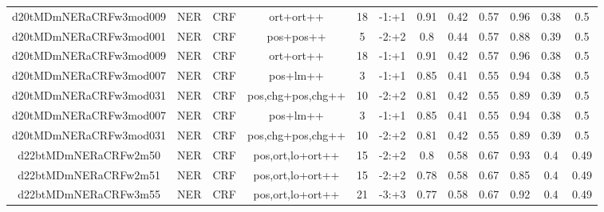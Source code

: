 \documentclass[a4paper]{article}
\begin{document}
\begin{landscape}
\begin{center}
\begin{tabular}{ |c|c|c|c|c|c|c|c|c|c|c|c|}
 
 	
 	\small{ d20tMDmNERaCRFw3mod009 } & \small{ NER} & \small{  CRF }  & ort+ort++  &  18 &  \small{  -1:+1 }  &  0.91 & 0.42 & 0.57  &  0.96 & 0.38 & 0.5 \\
 	

 
 	
 	\small{ d20tMDmNERaCRFw3mod001 } & \small{ NER} & \small{  CRF }  & pos+pos++  &  5 &  \small{  -2:+2 }  &  0.8 & 0.44 & 0.57  &  0.88 & 0.39 & 0.5 \\
 	

 
 	
 	\small{ d20tMDmNERaCRFw3mod009 } & \small{ NER} & \small{  CRF }  & ort+ort++  &  18 &  \small{  -1:+1 }  &  0.91 & 0.42 & 0.57  &  0.96 & 0.38 & 0.5 \\
 	

 
 	
 	\small{ d20tMDmNERaCRFw3mod007 } & \small{ NER} & \small{  CRF }  & pos+lm++  &  3 &  \small{  -1:+1 }  &  0.85 & 0.41 & 0.55  &  0.94 & 0.38 & 0.5 \\
 	

 
 	
 	\small{ d20tMDmNERaCRFw3mod031 } & \small{ NER} & \small{  CRF }  & pos,chg+pos,chg++  &  10 &  \small{  -2:+2 }  &  0.81 & 0.42 & 0.55  &  0.89 & 0.39 & 0.5 \\
 	

 
 	
 	\small{ d20tMDmNERaCRFw3mod007 } & \small{ NER} & \small{  CRF }  & pos+lm++  &  3 &  \small{  -1:+1 }  &  0.85 & 0.41 & 0.55  &  0.94 & 0.38 & 0.5 \\
 	

 
 	
 	\small{ d20tMDmNERaCRFw3mod031 } & \small{ NER} & \small{  CRF }  & pos,chg+pos,chg++  &  10 &  \small{  -2:+2 }  &  0.81 & 0.42 & 0.55  &  0.89 & 0.39 & 0.5 \\
 	

 
 	
 	\small{ d22btMDmNERaCRFw2m50 } & \small{ NER} & \small{  CRF }  & pos,ort,lo+ort++  &  15 &  \small{  -2:+2 }  &  0.8 & 0.58 & 0.67  &  0.93 & 0.4 & 0.49 \\
 	

 
 	
 	\small{ d22btMDmNERaCRFw2m51 } & \small{ NER} & \small{  CRF }  & pos,ort,lo+ort++  &  15 &  \small{  -2:+2 }  &  0.78 & 0.58 & 0.67  &  0.85 & 0.4 & 0.49 \\
 	

 
 	
 	\small{ d22btMDmNERaCRFw3m55 } & \small{ NER} & \small{  CRF }  & pos,ort,lo+ort++  &  21 &  \small{  -3:+3 }  &  0.77 & 0.58 & 0.67  &  0.92 & 0.4 & 0.49 \\
 	


\end{tabular}
\end{center}
\end{landscape}
\end{document}
